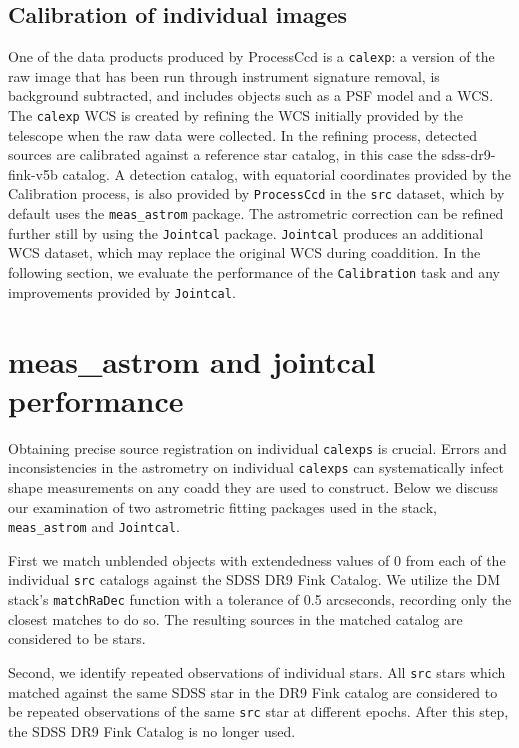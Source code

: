 \documentclass[modern]{aastex61}
\begin{document}
\subsection{Calibration of individual images}
One of the data products produced by ProcessCcd is a {\tt\string calexp}: a version of the raw image that has been run through instrument signature removal, is background subtracted, and includes objects such as a PSF model and a WCS. The {\tt\string calexp} WCS is created by refining the WCS initially provided by the telescope when the raw data were collected. In the refining process, detected sources are calibrated against a reference star catalog, in this case the sdss-dr9-fink-v5b catalog. A detection catalog, with equatorial coordinates provided by the Calibration process, is also provided by {\tt\string ProcessCcd} in the {\tt\string src} dataset, which by default uses the {\tt\string meas\_astrom} package. The astrometric correction can be refined further still by using the {\tt\string Jointcal} package. {\tt\string Jointcal} produces an additional WCS dataset, which may replace the original WCS during coaddition. In the following section, we evaluate the performance of the {\tt\string Calibration} task and any improvements provided by {\tt\string Jointcal}.

\section{meas\_astrom and jointcal performance}
Obtaining precise source registration on individual {\tt\string calexps} is crucial. Errors and inconsistencies in the astrometry on individual {\tt\string calexps} can systematically infect shape measurements on any coadd they are used to construct. Below we discuss our examination of two astrometric fitting packages used in the stack, {\tt\string meas\_astrom} and {\tt\string Jointcal}. 

First we match unblended objects with extendedness values of 0 from each of the individual {\tt\string src} catalogs against the SDSS DR9 Fink Catalog. We utilize the DM stack's {\tt\string matchRaDec} function with a tolerance of 0.5 arcseconds, recording only the closest matches to do so. The resulting sources in the matched catalog are considered to be stars. 

Second, we identify repeated observations of individual stars. All {\tt\string src} stars which matched against the same SDSS star in the DR9 Fink catalog are considered to be repeated observations of the same {\tt\string src} star at different epochs. After this step, the SDSS DR9 Fink Catalog is no longer used. 
\end{document}
